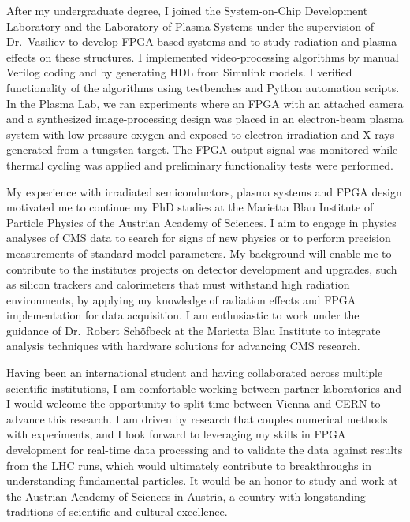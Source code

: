 \documentclass[a4paper,12pt]{article}
\begin{document}
\vspace{10pt}
After my undergraduate degree, I joined the System-on-Chip Development Laboratory and the Laboratory of Plasma Systems under the supervision of Dr.\ Vasiliev to develop FPGA-based systems and to study radiation and plasma effects on these structures. I implemented video-processing algorithms by manual Verilog coding and by generating HDL from Simulink models. I verified functionality of the algorithms using testbenches and Python automation scripts. In the Plasma Lab, we ran experiments where an FPGA with an attached camera and a synthesized image-processing design was placed in an electron-beam plasma system with low-pressure oxygen and exposed to electron irradiation and X-rays generated from a tungsten target. The FPGA output signal was monitored while thermal cycling was applied and preliminary functionality tests were performed. 

\newpage

\vspace{10pt}
My experience with irradiated semiconductors, plasma systems and FPGA design motivated me to continue my PhD studies at the Marietta Blau Institute of Particle Physics of the Austrian Academy of Sciences. I aim to engage in physics analyses of CMS data to search for signs of new physics or to perform precision measurements of standard model parameters. My background will enable me to contribute to the institutes projects on detector development and upgrades, such as silicon trackers and calorimeters that must withstand high radiation environments, by applying my knowledge of radiation effects and FPGA implementation for data acquisition. I am enthusiastic to work under the guidance of Dr.\ Robert Schöfbeck at the Marietta Blau Institute to integrate analysis techniques with hardware solutions for advancing CMS research.

\vspace{10pt}
Having been an international student and having collaborated across multiple scientific institutions, I am comfortable working between partner laboratories and I would welcome the opportunity to split time between Vienna and CERN to advance this research. I am driven by research that couples numerical methods with experiments, and I look forward to leveraging my skills in FPGA development for real-time data processing and to validate the data against results from the LHC runs, which would ultimately contribute to breakthroughs in understanding fundamental particles. It would be an honor to study and work at the Austrian Academy of Sciences in Austria, a country with longstanding traditions of scientific and cultural excellence.
\end{document}
